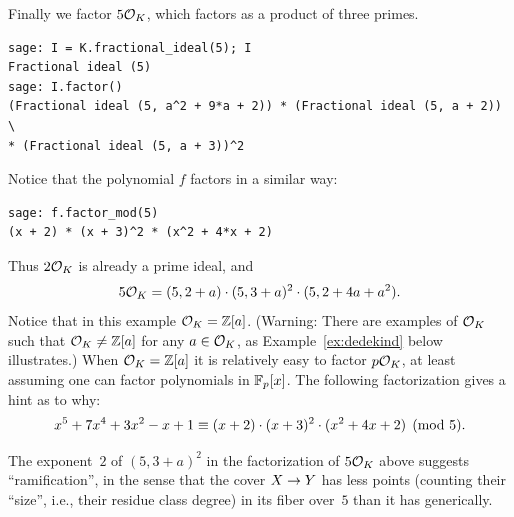 \par\noindent{}Finally we factor $5\mathcal{O}_K$, which factors as a product of three
primes.
\begin{verbatim}
sage: I = K.fractional_ideal(5); I
Fractional ideal (5)
sage: I.factor()
(Fractional ideal (5, a^2 + 9*a + 2)) * (Fractional ideal (5, a + 2)) \
* (Fractional ideal (5, a + 3))^2
\end{verbatim}
Notice that the polynomial $f$ factors in a similar way:
\begin{verbatim}
sage: f.factor_mod(5)
(x + 2) * (x + 3)^2 * (x^2 + 4*x + 2)
\end{verbatim}
Thus $2\mathcal{O}_K$ is already a prime ideal, and
$$
  5\mathcal{O}_K = (5,2+a)\cdot(5,3+a)^2\cdot(5,2+4a+a^2).
$$
Notice that in this example $\mathcal{O}_K=\mathbb{Z}[a]$.  (Warning: There are
examples of $\mathcal{O}_K$ such that $\mathcal{O}_K\neq \mathbb{Z}[a]$ for any $a\in\mathcal{O}_K$, as
Example~\ref{ex:dedekind} below illustrates.)  When $\mathcal{O}_K=\mathbb{Z}[a]$ it is
relatively easy to factor $p\mathcal{O}_K$, at least assuming one can factor
polynomials in $\mathbb{F}_p[x]$.  The following
factorization gives a hint as to why:
$$
  x^5+7x^4+3x^2-x+1 \equiv (x+2)\cdot (x+3)^2 \cdot (x^2+4x+2)\pmod{5}.
$$

The exponent~$2$ of $(5,3+a)^2$ in the factorization of $5\mathcal{O}_K$ above
suggests ``ramification'',
in the sense that the cover $X\rightarrow Y$ has less points (counting their ``size'', i.e.,
their residue class degree) in its fiber over~$5$ than
it has generically.




